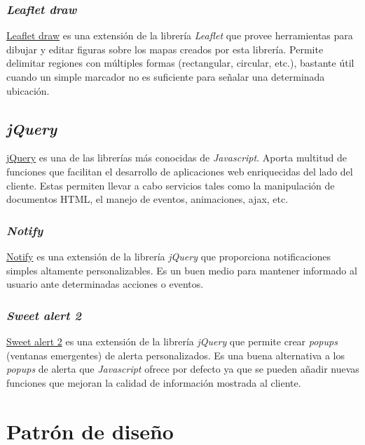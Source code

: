 \subsubsection{\emph{Leaflet draw}}

\href{https://github.com/Leaflet/Leaflet.draw}{Leaflet draw} es una
extensión de la librería \emph{Leaflet} que provee herramientas para
dibujar y editar figuras sobre los mapas creados por esta librería.
Permite delimitar regiones con múltiples formas (rectangular, circular,
etc.), bastante útil cuando un simple marcador no es suficiente
para señalar una determinada ubicación.

\subsection{\emph{jQuery}}

\href{https://jquery.com/}{jQuery} es una de las librerías más conocidas
de \emph{Javascript}. Aporta multitud de funciones que facilitan el
desarrollo de aplicaciones web enriquecidas del lado del cliente. Estas
permiten llevar a cabo servicios tales como la manipulación de
documentos HTML, el manejo de eventos, animaciones, ajax, etc.

\subsubsection{\emph{Notify}}

\href{https://notifyjs.jpillora.com/}{Notify} es una extensión de la
librería \emph{jQuery} que proporciona notificaciones simples altamente
personalizables. Es un buen medio para mantener informado al usuario
ante determinadas acciones o eventos.

\subsubsection{\emph{Sweet alert 2}}

\href{https://github.com/sweetalert2/sweetalert2}{Sweet alert 2} es una
extensión de la librería \emph{jQuery} que permite crear \emph{popups}
(ventanas emergentes) de alerta personalizados. Es una buena alternativa
a los \emph{popups} de alerta que \emph{Javascript} ofrece por defecto ya que
se pueden añadir nuevas funciones que mejoran la calidad de información
mostrada al cliente.

\section{Patrón de diseño}

